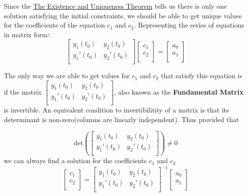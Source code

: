 \documentclass{report}
\begin{document}
Since the \hyperref[th:Ex&Un]{The Existence and Uniqueness Theorem} tells us there is only one solution satisfying the initial constraints, we should be able to get unique values for the coefficients of the equation $c_1$ and $c_2$. Representing the series of equations in matrix form:
$$
\begin{bmatrix}
    y_1(t_0) & y_2(t_0) \\
    y_1'(t_0) & y_2'(t_0) \\
\end{bmatrix}
\begin{bmatrix}
    c_1 \\
    c_2 \\
\end{bmatrix}
=
\begin{bmatrix}
    a_0 \\
    a_1 \\
\end{bmatrix}
$$

The only way we are able to get values for $c_1$ and $c_2$ that satisfy this equation is if the matrix 
$\begin{bmatrix}
    y_1(t_0) & y_2(t_0) \\
    y_1'(t_0) & y_2'(t_0) \\
\end{bmatrix}$,
also known as the \textbf{Fundamental Matrix} is invertible. An equivalent condition to invertibilitity of a matrix is that its determinant is non-zero(columns are linearly independent). Thus provided that

$$\text{det}\left(\begin{bmatrix}
    y_1(t_0) & y_2(t_0) \\
    y_1'(t_0) & y_2'(t_0) \\
\end{bmatrix}\right)
\neq 0
$$
we can always find a solution for the coefficients $c_1$ and $c_2$
$$
\begin{bmatrix}
    c_1 \\
    c_2 \\
\end{bmatrix}
=
\begin{bmatrix}
    y_1(t_0) & y_2(t_0) \\
    y_1'(t_0) & y_2'(t_0) \\
\end{bmatrix}^{-1}
\begin{bmatrix}
    a_0 \\
    a_1 \\
\end{bmatrix}
$$
\end{document}
